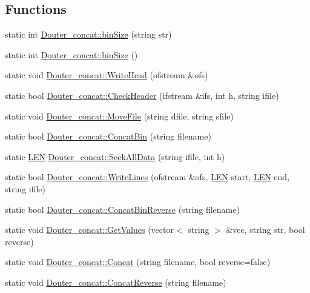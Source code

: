 \subsection*{Functions}
\begin{DoxyCompactItemize}
\item 
static int \hyperlink{namespace_douter__concat_ad5a88da78fc32f038112942cc050229a}{Douter\+\_\+concat\+::bin\+Size} (string str)
\item 
static int \hyperlink{namespace_douter__concat_a9285724679e63cb19699979337517a81}{Douter\+\_\+concat\+::bin\+Size} ()
\item 
static void \hyperlink{namespace_douter__concat_a4d11def509a5faec6eee9dc701bf7162}{Douter\+\_\+concat\+::\+Write\+Head} (ofstream \&ofs)
\item 
static bool \hyperlink{namespace_douter__concat_a8193758a199f8c1b2dbaab322243d939}{Douter\+\_\+concat\+::\+Check\+Header} (ifstream \&ifs, int h, string ifile)
\item 
static void \hyperlink{namespace_douter__concat_a489b9b4145e9325aef23c587c29e939d}{Douter\+\_\+concat\+::\+Move\+File} (string dfile, string sfile)
\item 
static bool \hyperlink{namespace_douter__concat_a893fb2379796ffd3bb05818f0ef9ebf6}{Douter\+\_\+concat\+::\+Concat\+Bin} (string filename)
\item 
static \hyperlink{energy__const_8hh_a05b49c662c073f89e86804f7856622a0}{L\+E\+N} \hyperlink{namespace_douter__concat_a813d0a9403cf1fbf7d90b9a92cf9987f}{Douter\+\_\+concat\+::\+Seek\+All\+Data} (string ifile, int h)
\item 
static bool \hyperlink{namespace_douter__concat_acbcc8dc878123eaa210fe5c79c9fc13a}{Douter\+\_\+concat\+::\+Write\+Lines} (ofstream \&ofs, \hyperlink{energy__const_8hh_a05b49c662c073f89e86804f7856622a0}{L\+E\+N} start, \hyperlink{energy__const_8hh_a05b49c662c073f89e86804f7856622a0}{L\+E\+N} end, string ifile)
\item 
static bool \hyperlink{namespace_douter__concat_adcc0d9bde56ec5d6d73bd33f200b3f99}{Douter\+\_\+concat\+::\+Concat\+Bin\+Reverse} (string filename)
\item 
static void \hyperlink{namespace_douter__concat_ab7c6a14da8d315c92d6b73d7bbb42eab}{Douter\+\_\+concat\+::\+Get\+Values} (vector$<$ string $>$ \&vec, string str, bool reverse)
\item 
static void \hyperlink{namespace_douter__concat_a263bd0f94dd48039d12ca670533b5709}{Douter\+\_\+concat\+::\+Concat} (string filename, bool reverse=false)
\item 
static void \hyperlink{namespace_douter__concat_a9d79d3e99a422f02d168f74c29522af2}{Douter\+\_\+concat\+::\+Concat\+Reverse} (string filename)
\end{DoxyCompactItemize}


